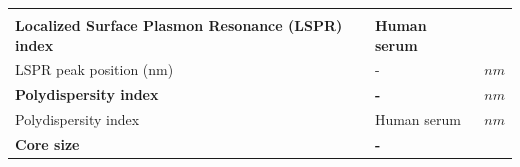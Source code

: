\documentclass[utf8]{frontiersHLTH} %
\begin{document}
\begin{longtable}[]{@{}lll@{}}
\begin{minipage}[t]{0.13\columnwidth}
\strut
\end{minipage}\tabularnewline
\begin{minipage}[t]{0.58\columnwidth}\raggedright\strut
\textbf{Localized Surface Plasmon Resonance (LSPR) index}\strut
\end{minipage} & \begin{minipage}[t]{0.20\columnwidth}\raggedright\strut
\textbf{Human serum}\strut
\end{minipage} & \begin{minipage}[t]{0.13\columnwidth}\raggedright\strut
\strut
\end{minipage}\tabularnewline
\begin{minipage}[t]{0.58\columnwidth}\raggedright\strut
LSPR peak position (nm)\strut
\end{minipage} & \begin{minipage}[t]{0.20\columnwidth}\raggedright\strut
-\strut
\end{minipage} & \begin{minipage}[t]{0.13\columnwidth}\raggedright\strut
\(nm\)\strut
\end{minipage}\tabularnewline
\begin{minipage}[t]{0.58\columnwidth}\raggedright\strut
\textbf{Polydispersity index}\strut
\end{minipage} & \begin{minipage}[t]{0.20\columnwidth}\raggedright\strut
\textbf{-}\strut
\end{minipage} & \begin{minipage}[t]{0.13\columnwidth}\raggedright\strut
\(nm\)\strut
\end{minipage}\tabularnewline
\begin{minipage}[t]{0.58\columnwidth}\raggedright\strut
Polydispersity index\strut
\end{minipage} & \begin{minipage}[t]{0.20\columnwidth}\raggedright\strut
Human serum\strut
\end{minipage} & \begin{minipage}[t]{0.13\columnwidth}\raggedright\strut
\(nm\)\strut
\end{minipage}\tabularnewline
\begin{minipage}[t]{0.58\columnwidth}\raggedright\strut
\textbf{Core size}\strut
\end{minipage} & \begin{minipage}[t]{0.20\columnwidth}\raggedright\strut
\textbf{-}\strut
\end{minipage} & \begin{minipage}[t]{0.13\columnwidth}\raggedright\strut

\end{minipage}
\end{longtable}
\end{document}
